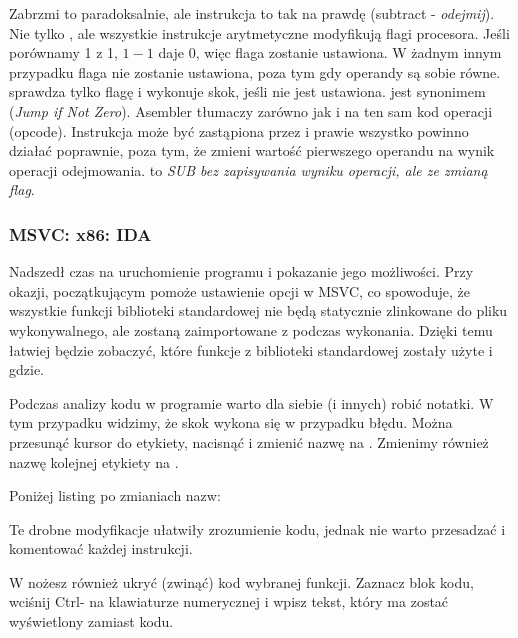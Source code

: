 \label{CMPandSUB}
Zabrzmi to paradoksalnie, ale instrukcja \CMP to tak na prawdę \SUB (subtract - \emph{odejmij}).
Nie tylko \CMP, ale wszystkie instrukcje arytmetyczne modyfikują flagi procesora.
Jeśli porównamy 1 z 1, $1-1$ daje 0, więc flaga \ZF zostanie ustawiona.
W żadnym innym przypadku flaga \ZF nie zostanie ustawiona, poza tym gdy operandy są sobie równe.
\JNE sprawdza tylko flagę \ZF i wykonuje skok, jeśli nie jest ustawiona. \JNE jest synonimem \JNZ (\emph{Jump if Not Zero}).
Asembler tłumaczy zarówno \JNE jak i \JNZ na ten sam kod operacji (opcode).
Instrukcja \CMP może być zastąpiona przez \SUB i prawie wszystko powinno działać poprawnie, poza tym, że \SUB zmieni wartość pierwszego operandu na wynik operacji odejmowania.
\CMP to \emph{SUB bez zapisywania wyniku operacji, ale ze zmianą flag}.

\subsubsection{MSVC: x86: IDA}

Nadszedł czas na uruchomienie programu \IDA i pokazanie jego możliwości.
Przy okazji, początkującym pomoże ustawienie opcji  w MSVC, co spowoduje, że wszystkie
funkcji biblioteki standardowej nie będą statycznie zlinkowane do pliku wykonywalnego,
ale zostaną zaimportowane z  podczas wykonania.
Dzięki temu łatwiej będzie zobaczyć, które funkcje z biblioteki standardowej zostały użyte i gdzie.

Podczas analizy kodu w programie \IDA warto dla siebie (i innych) robić notatki.
W tym przypadku widzimy, że skok  wykona się w przypadku błędu.
Można przesunąć kursor do etykiety, nacisnąć  i zmienić nazwę na .
Zmienimy również nazwę kolejnej etykiety na .

Poniżej listing po zmianiach nazw:



Te drobne modyfikacje ułatwiły zrozumienie kodu, jednak nie warto przesadzać i komentować każdej instrukcji.

W \IDA nożesz również ukryć (zwinąć) kod wybranej funkcji.
Zaznacz blok kodu, wciśnij Ctrl-\q{--} na klawiaturze numerycznej i wpisz tekst, który ma
zostać wyświetlony zamiast kodu.

